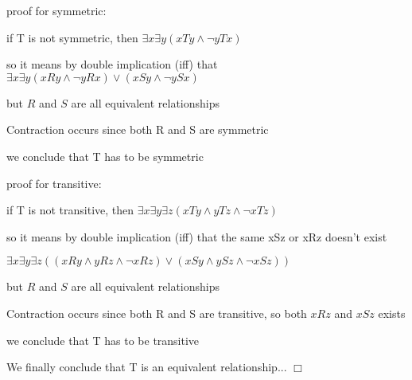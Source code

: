 \documentclass[12pts,A4]{article}
\begin{document}
\begin{flushleft}
    proof for symmetric:
    
    \bigskip

    if T is not symmetric, then $ \exists x \exists y  ( xTy \wedge \neg y T x) $

    so it means by double implication (iff) that $ \exists x \exists y  ( xRy \wedge \neg y R x) 
    \vee ( xSy\wedge \neg y S x) $

    

    but $R$ and $S$ are all equivalent relationships 

    Contraction occurs since both R and S are symmetric  


    we conclude that T has to be symmetric


    \bigskip

    proof for transitive:
    
    \bigskip

    if T is not transitive, then $ \exists x \exists y \exists z
    (xTy \wedge yTz \wedge \neg xTz)$

    so it means by double implication (iff) that the same xSz or xRz doesn't exist
    
    $ \exists x \exists y \exists z( (xRy \wedge yRz \wedge \neg xRz) \vee
(xSy \wedge ySz \wedge \neg xSz))$
    

    

    but $R$ and $S$ are all equivalent relationships 

    Contraction occurs since both R and S are transitive, 
    so both $xRz$ and $xSz$ exists 


    we conclude that T has to be transitive


    \bigskip


    We finally conclude that T is an equivalent relationship... $\Box$



\end{flushleft}
\end{document}
